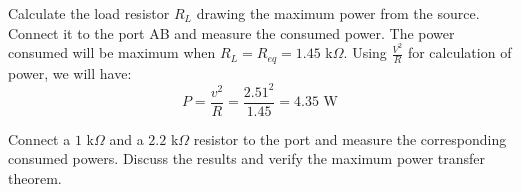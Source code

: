 \documentclass[11pt]{article}
\begin{document}
\begin{question}
\begin{subquestion}{Calculate the load resistor $R_L$ drawing the maximum power from the source. Connect it to the port AB and measure the consumed power.}
{            The power consumed will be maximum when $R_L = R_{eq} = 1.45$ k$\Omega$.
            Using $\frac{V^2}{R}$ for calculation of power, we will have:
            \begin{equation*}
                P = \frac{v^2}{R} = \frac{2.51^2}{1.45} = 4.35 \text{ W}
            \end{equation*}
        }
    \end{subquestion}

    \begin{subquestion}{Connect a $1$ k$\Omega$ and a $2.2$ k$\Omega$ resistor to the port and measure the corresponding consumed powers. Discuss the results and verify the maximum power transfer theorem.}
\end{subquestion}
\end{question}
\end{document}
